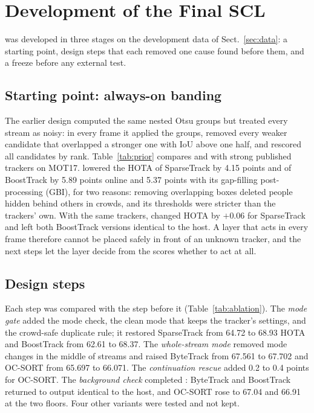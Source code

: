 \section{Development of the Final SCL}\label{sec:development}

\scl{} was developed in three stages on the development data of Sect.~\ref{sec:data}: a starting
point, design steps that each removed one cause found before them, and a freeze before any external
test.

\subsection{Starting point: always-on banding}\label{sec:prior}
The earlier design \aob{} computed the same nested Otsu groups but treated every stream as noisy:
in every frame it applied the groups, removed every weaker candidate that overlapped a stronger one
with IoU above one half, and rescored all candidates by rank. Table~\ref{tab:prior} compares \aob{}
and \scl{} with strong published trackers on MOT17. \aob{} lowered the HOTA of SparseTrack by 4.15
points and of BoostTrack by 5.89 points online and 5.37 points with its gap-filling post-processing
(GBI), for two reasons: removing overlapping boxes deleted people hidden behind others in crowds,
and its thresholds were stricter than the trackers' own. With the same trackers, \scl{} changed
HOTA by $+0.06$ for SparseTrack and left both BoostTrack versions identical to the host. A layer
that acts in every frame therefore cannot be placed safely in front of an unknown tracker, and the
next steps let the layer decide from the scores whether to act at all.



\subsection{Design steps}\label{sec:steps}
Each step was compared with the step before it (Table~\ref{tab:ablation}). The \emph{mode gate}
added the mode check, the clean mode that keeps the tracker's settings, and the crowd-safe duplicate
rule; it restored SparseTrack from 64.72 to 68.93 HOTA and BoostTrack from 62.61 to 68.37. The
\emph{whole-stream mode} removed mode changes in the middle of streams and raised ByteTrack from
67.561 to 67.702 and OC-SORT from 65.697 to 66.071. The \emph{continuation rescue} added 0.2 to 0.4
points for OC-SORT. The \emph{background check} completed \scl{}: ByteTrack and BoostTrack returned
to output identical to the host, and OC-SORT rose to 67.04 and 66.91 at the two floors. Four other
variants were tested and not kept.

